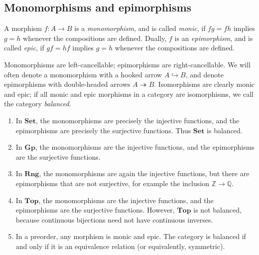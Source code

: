 \subsection{Monomorphisms and epimorphisms}
\begin{definition}
    A morphism \( f : A \to B \) is a \emph{monomorphism}, and is called \emph{monic}, if \( fg = fh \) implies \( g = h \) whenever the compositions are defined.
    Dually, \( f \) is an \emph{epimorphism}, and is called \emph{epic}, if \( gf = hf \) implies \( g = h \) whenever the compositions are defined.
\end{definition}
Monomorphisms are left-cancellable; epimorphisms are right-cancellable.
We will often denote a monomorphism with a hooked arrow \( A \hookrightarrow B \), and denote epimorphisms with double-headed arrows \( A \twoheadrightarrow B \).
Isomorphisms are clearly monic and epic; if all monic and epic morphisms in a category are isomorphisms, we call the category \emph{balanced}.
\begin{example}
    \begin{enumerate}
        \item In \( \mathbf{Set} \), the monomorphisms are precisely the injective functions, and the epimorphisms are precisely the surjective functions.
        Thus \( \mathbf{Set} \) is balanced.
        \item In \( \mathbf{Gp} \), the monomorphisms are the injective functions, and the epimorphisms are the surjective functions.
        \item In \( \mathbf{Rng} \), the monomorphisms are again the injective functions, but there are epimorphisms that are not surjective, for example the inclusion \( \mathbb Z \to \mathbb Q \).
        \item In \( \mathbf{Top} \), the monomorphisms are the injective functions, and the epimorphisms are the surjective functions.
        However, \( \mathbf{Top} \) is not balanced, because continuous bijections need not have continuous inverses.
        \item In a preorder, any morphism is monic and epic.
        The category is balanced if and only if it is an equivalence relation (or equivalently, symmetric).
    \end{enumerate}
\end{example}
